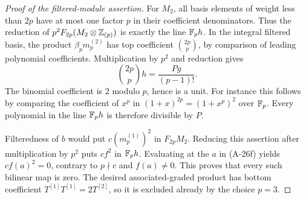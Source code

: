 \begin{proof}[Proof of the filtered-module assertion]
For \(M_2\), all basis elements of weight less than \(2p\)
have at most one factor \(p\) in their coefficient denominators.
Thus the reduction of
\(p^2F_{2p}(M_2\otimes\mathbb Z_{(p)})\) is exactly the line
\(\mathbb F_ph\). In the integral filtered basis, the product
\(\beta_p m_p^{(2)}\) has top coefficient
\(\binom{2p}{p}\), by comparison of leading polynomial
coefficients. Multiplication by \(p^2\) and reduction gives
\[
          \binom{2p}{p}h=\frac{Pg}{(p-1)!}.
 \tag{A-26g}
\]
The binomial coefficient is \(2\) modulo \(p\), hence is a unit.
For instance this follows by comparing the coefficient of
\(x^p\) in \((1+x)^{2p}=(1+x^p)^2\) over \(\mathbb F_p\).
Every polynomial in the line \(\mathbb F_ph\) is therefore divisible
by \(P\).

Filteredness of \(b\) would put
\(c(m_p^{(1)})^2\) in \(F_{2p}M_2\). Reducing this assertion
after multiplication by \(p^2\) puts \(cf^2\) in \(\mathbb F_ph\).
Evaluating at the \(a\) in (A-26f) yields
\(cf(a)^2=0\), contrary to \(p\nmid c\) and \(f(a)\ne0\).
This proves that every such bilinear map is zero. The
desired associated-graded product has bottom coefficient
\(T^{[1]}T^{[1]}=2T^{[2]}\), so it is excluded already by
the choice \(p=3\).
\end{proof}

